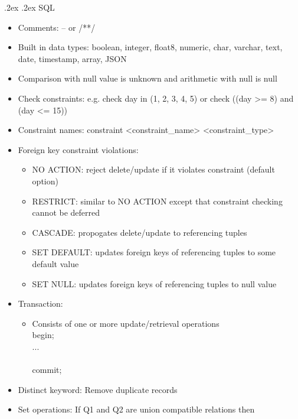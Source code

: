 \documentclass[10pt,landscape,a4paper]{scrartcl}
\makeatletter
\renewcommand{\section}{\@startsection{section}{1}{0mm}%
  {.2ex}%
  {.2ex}%
{\color{myblue}\sffamily\small\bfseries}}
\makeatother
\begin{document}
\setlength{\abovedisplayskip}{0pt}
\setlength{\belowdisplayskip}{0pt}


\scriptsize
\begin{multicols*}{4}
  \raggedcolumns
  \section{SQL}
  \begin{itemize}
      \item Comments: -- or /**/
      \item Built in data types: boolean, integer, float8, numeric, char, varchar, text, date, timestamp, array, JSON
      \item Comparison with null value is unknown and arithmetic with null is null
      \item Check constraints: e.g. check day in (1, 2, 3, 4, 5) or check ((day >= 8) and (day <= 15))
      \item Constraint names: constraint <constraint\_name> <constraint\_type>
      \item Foreign key constraint violations:
      \begin{itemize}
          \item NO ACTION: reject delete/update if it violates constraint (default option)
          \item RESTRICT: similar to NO ACTION except that constraint checking cannot be deferred
          \item CASCADE: propogates delete/update to referencing tuples
          \item SET DEFAULT: updates foreign keys of referencing tuples to some default value
          \item SET NULL: updates foreign keys of referencing tuples to null value
      \end{itemize}
      \item Transaction:
      \begin{itemize}
          \item Consists of one or more update/retrieval operations \\
          begin; \\
          ... \\ \\
          commit;
      \end{itemize}
      \item Distinct keyword: Remove duplicate records
      \item Set operations: If Q1 and Q2 are union compatible relations then

\end{itemize}
\end{multicols*}
\end{document}
